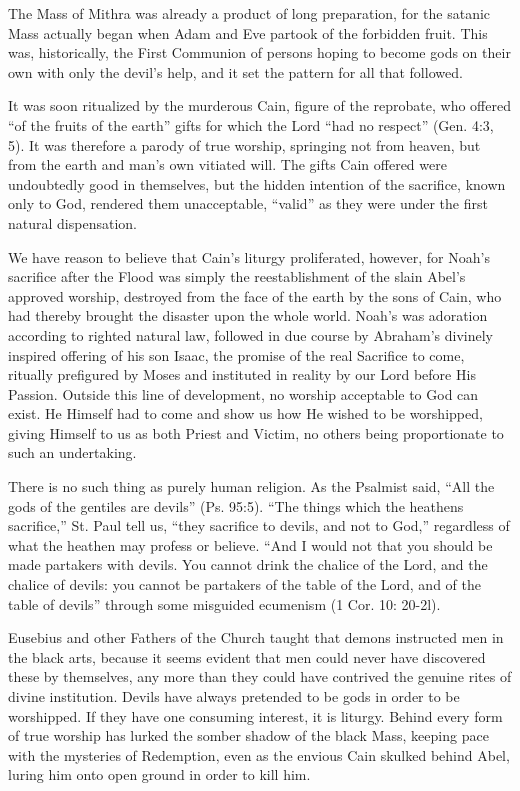 The Mass of Mithra was already a product of long preparation, for the satanic Mass actually began when Adam and Eve partook of the forbidden fruit. This was, historically, the First Communion of persons hoping to become gods on their own with only the devil's help, and it set the pattern for all that followed.

It was soon ritualized by the murderous Cain, figure of the reprobate, who offered ``of the fruits of the earth'' gifts for which the Lord ``had no respect'' (Gen. 4:3, 5). It was therefore a parody of true worship, springing not from heaven, but from the earth and man's own vitiated will. The gifts Cain offered were undoubtedly good in themselves, but the hidden intention of the sacrifice, known only to God, rendered them unacceptable, ``valid'' as they were under the first natural dispensation.

We have reason to believe that Cain's liturgy proliferated, however, for Noah's sacrifice after the Flood was simply the reestablishment of the slain Abel's approved worship, destroyed from the face of the earth by the sons of Cain, who had thereby brought the disaster upon the whole world. Noah's was adoration according to righted natural law, followed in due course by Abraham's divinely inspired offering of his son Isaac, the promise of the real Sacrifice to come, ritually prefigured by Moses and instituted in reality by our Lord before His Passion. Outside this line of development, no worship acceptable to God can exist. He Himself had to come and show us how He wished to be worshipped, giving Himself to us as both Priest and Victim, no others being proportionate to such an undertaking.

There is no such thing as purely human religion. As the Psalmist said, ``All the gods of the gentiles are devils'' (Ps. 95:5). ``The things which the heathens sacrifice,'' St. Paul tell us, ``they sacrifice to devils, and not to God,'' regardless of what the heathen may profess or believe. ``And I would not that you should be made partakers with devils. You cannot drink the chalice of the Lord, and the chalice of devils: you cannot be partakers of the table of the Lord, and of the table of devils'' through some misguided ecumenism (1 Cor. 10: 20-2l).

Eusebius and other Fathers of the Church taught that demons instructed men in the black arts, because it seems evident that men could never have discovered these by themselves, any more than they could have contrived the genuine rites of divine institution. Devils have always pretended to be gods in order to be worshipped. If they have one consuming interest, it is liturgy. Behind every form of true worship has lurked the somber shadow of the black Mass, keeping pace with the mysteries of Redemption, even as the envious Cain skulked behind Abel, luring him onto open ground in order to kill him.

